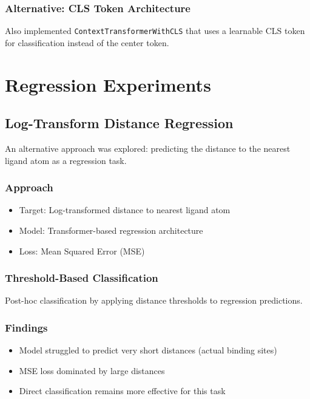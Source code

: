 \documentclass[11pt,a4paper]{article}
\begin{document}
\subsubsection{Alternative: CLS Token Architecture}
Also implemented \texttt{ContextTransformerWithCLS} that uses a learnable CLS token for classification instead of the center token.

\section{Regression Experiments}

\subsection{Log-Transform Distance Regression}
An alternative approach was explored: predicting the distance to the nearest ligand atom as a regression task.

\subsubsection{Approach}
\begin{itemize}
    \item Target: Log-transformed distance to nearest ligand atom
    \item Model: Transformer-based regression architecture
    \item Loss: Mean Squared Error (MSE)
\end{itemize}

\subsubsection{Threshold-Based Classification}
Post-hoc classification by applying distance thresholds to regression predictions.

\subsubsection{Findings}
\begin{itemize}
    \item Model struggled to predict very short distances (actual binding sites)
    \item MSE loss dominated by large distances
    \item Direct classification remains more effective for this task
\end{itemize}
\end{document}
